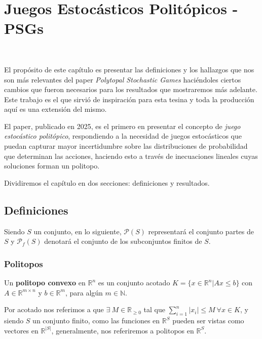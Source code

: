 \chapter{Juegos Estocásticos Politópicos - PSGs}
~\label{cap:psg}
\vspace{-1cm}

El propósito de este capítulo es presentar las definiciones y los hallazgos que
nos son más relevantes del paper \textit{Polytopal Stochastic Games}
\cite{Polytopal} haciéndoles ciertos cambios que fueron necesarios para los
resultados que mostraremos más adelante. Este trabajo es el que sirvió de
inspiración para esta tesina y toda la producción aquí es una extensión del
mismo.

El paper, publicado en 2025, es el primero en presentar el concepto de
\textit{juego estocástico politópico}, respondiendo a la necesidad de juegos
estocásticos que puedan capturar mayor incertidumbre sobre las distribuciones
de probabilidad que determinan las acciones, haciendo esto a través de
inecuaciones lineales cuyas soluciones forman un politopo.


Dividiremos el capítulo en dos secciones: definiciones y resultados.

\section{Definiciones}

Siendo $S$ un conjunto, en lo siguiente, $\mathscr{P}(S)$ representará el
conjunto partes de $S$ y $\mathscr{P}_f(S)$ denotará el conjunto de los
subconjuntos finitos de $S$.

\subsection*{Politopos}

Un \textbf{politopo convexo} en $\mathbb{R}^n$ es un conjunto acotado $K = \{ x
	\in \mathbb{R}^n | Ax \leq b\}$ con $A \in \mathbb{R}^{m\times n}$ y $ b \in
	\mathbb{R}^m$, para algún $m \in \mathbb{N}$.

Por acotado nos referimos a que $\exists \ M \in \mathbb{R}_{\geq 0}$ tal que
$\sum_{i=1}^{n} |x_i| \leq M \ \forall x \in K$, y siendo $S$ un conjunto
finito, como las funciones en $\mathbb{R}^S$ pueden ser vistas como vectores en
$\mathbb{R}^{|S|}$, generalmente, nos referiremos a politopos en
$\mathbb{R}^S$.

